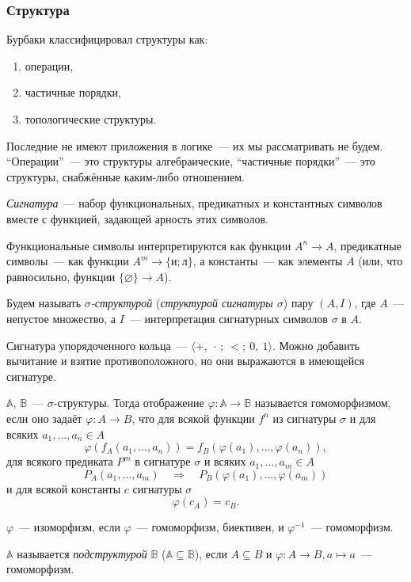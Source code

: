 ﻿\subsubsection{Структура}

Бурбаки классифицировал структуры как:
\begin{enumerate}[itemsep=-1.4mm]
	\item операции,
	\item частичные порядки,
	\item топологические структуры.
\end{enumerate}

Последние не имеют приложения в логике~— их мы рассматривать не будем. “Операции”~— это структуры алгебраические, “частичные порядки”~— это структуры, снабжённые каким-либо отношением.

\begin{definition}
	\emph{Сигнатура}~— набор функциональных, предикатных и константных символов вместе с функцией, задающей арность этих символов.

	Функциональные символы интерпретируются как функции $A^n \to A$, предикатные символы~— как функции $A^m \to \{\text{и}; \text{л}\}$, а константы~— как элементы $A$ (или, что равносильно, функции $\{\varnothing\} \to A$).

	Будем называть \emph{$\sigma$-структурой} (\emph{структурой сигнатуры $\sigma$}) пару $(A, I)$, где $A$~— непустое множество, а $I$~— интерпретация сигнатурных символов $\sigma$ в $A$.
\end{definition}

\begin{exmpl}
	Сигнатура упорядоченного кольца~— $\langle {+},\ {\cdot}\,;\ {<};\ 0,\ 1 \rangle$. Можно добавить вычитание и взятие противоположного, но они выражаются в имеющейся сигнатуре.
\end{exmpl}

\begin{definition}
	$\mathbb{A}$, $\mathbb{B}$~— $\sigma$-структуры. Тогда отображение $\varphi: \mathbb{A} \to \mathbb{B}$ называется гомоморфизмом, если оно задаёт $\varphi: A \to B$, что для всякой функции $f^n$ из сигнатуры $\sigma$ и для всяких $a_1, \dots, a_n \in A$
	\[\varphi(f_A(a_1, \dots, a_n)) = f_B(\varphi(a_1), \dots, \varphi(a_n)),\]
	для всякого предиката $P^m$ в сигнатуре $\sigma$ и всяких $a_1, \dots, a_m \in A$
	\[P_A(a_1, \dots, a_m) \quad \Longrightarrow \quad P_B(\varphi(a_1), \dots, \varphi(a_m))\]
	и для всякой константы $c$ сигнатуры $\sigma$
	\[\varphi(c_A) = c_B.\]

	$\varphi$~— изоморфизм, если $\varphi$~— гомоморфизм, биективен, и $\varphi^{-1}$~— гомоморфизм.

	$\mathbb{A}$ называется \emph{подструктурой} $\mathbb{B}$ ($\mathbb{A} \subseteq \mathbb{B}$), если $A \subseteq B$ и $\varphi: A \to B, a \mapsto a$~— гомоморфизм.
\end{definition}

